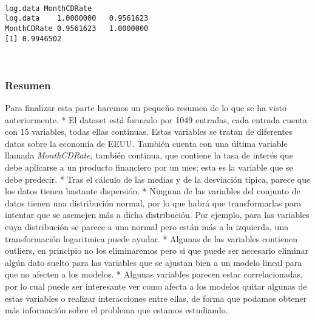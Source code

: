 \documentclass[11pt]{article}
\begin{document}
    
    
    
    
    \begin{center}
    \end{center}
    { \hspace*{\fill} \\}
    
    \begin{Verbatim}[commandchars=\\\{\}]
             log.data MonthCDRate
log.data    1.0000000   0.9561623
MonthCDRate 0.9561623   1.0000000
[1] 0.9946502

    \end{Verbatim}

    \begin{center}
    \end{center}
    { \hspace*{\fill} \\}
    
    \hypertarget{resumen}{%
\subsubsection{Resumen}\label{resumen}}

Para finalizar esta parte haremos un pequeño resumen de lo que se ha
visto anteriormente. * El dataset está formado por 1049 entradas, cada
entrada cuenta con 15 variables, todas ellas continuas. Estas variables
se tratan de diferentes datos sobre la economía de EEUU. También cuenta
con una última variable llamada \emph{MonthCDRate}, también continua,
que contiene la tasa de interés que debe aplicarse a un producto
financiero por un mes; esta es la variable que se debe predecir. * Tras
el cálculo de las medias y de la desviación típica, parece que los datos
tienen bastante dispersión. * Ninguna de las variables del conjunto de
datos tienen una distribución normal, por lo que habrá que
transformarlas para intentar que se asemejen más a dicha distribución.
Por ejemplo, para las variables cuya distribución se parece a una normal
pero están más a la izquierda, una transformación logaritmica puede
ayudar. * Algunas de las variables contienen outliers, en principio no
los eliminaremos pero si que puede ser necesario eliminar algún dato
suelto para las variables que se ajustan bien a un modelo lineal para
que no afecten a los modelos. * Algunas variables parecen estar
correlacionadas, por lo cual puede ser interesante ver como afecta a los
modelos quitar algunas de estas variables o realizar interacciones entre
ellas, de forma que podamos obtener más información sobre el problema
que estamos estudiando.
\end{document}

